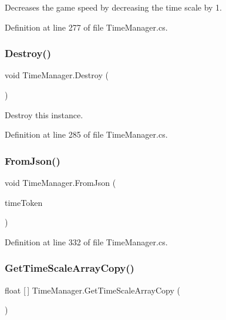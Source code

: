 Decreases the game speed by decreasing the time scale by 1. 



Definition at line 277 of file Time\+Manager.\+cs.

\mbox{\label{class_time_manager_a804d5557e6611976bcaf246c2ba2abc0}} 
\subsubsection{\texorpdfstring{Destroy()}{Destroy()}}
{\footnotesize\ttfamily void Time\+Manager.\+Destroy (\begin{DoxyParamCaption}{ }\end{DoxyParamCaption})}



Destroy this instance. 



Definition at line 285 of file Time\+Manager.\+cs.

\mbox{\label{class_time_manager_a3b14c9e855ae6faffeb22897f3a55caf}} 
\subsubsection{\texorpdfstring{From\+Json()}{FromJson()}}
{\footnotesize\ttfamily void Time\+Manager.\+From\+Json (\begin{DoxyParamCaption}\item[{J\+Token}]{time\+Token }\end{DoxyParamCaption})}



Definition at line 332 of file Time\+Manager.\+cs.

\mbox{\label{class_time_manager_a4d38aca3fb77a306f12058159418afa5}} 
\subsubsection{\texorpdfstring{Get\+Time\+Scale\+Array\+Copy()}{GetTimeScaleArrayCopy()}}
{\footnotesize\ttfamily float \mbox{[}$\,$\mbox{]} Time\+Manager.\+Get\+Time\+Scale\+Array\+Copy (\begin{DoxyParamCaption}{ }\end{DoxyParamCaption})}




